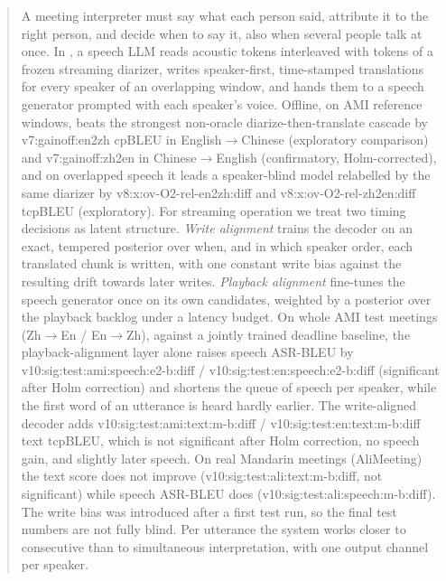 \begin{abstract}
A meeting interpreter must say what each person said, attribute it to the right person, and decide when to say it, also
when several people talk at once. In \sys{}, a speech LLM reads acoustic tokens interleaved with tokens of a frozen
streaming diarizer, writes speaker-first, time-stamped translations for every speaker of an overlapping window, and hands
them to a speech generator prompted with each speaker's voice. Offline, on AMI reference windows, \sys{} beats the
strongest non-oracle diarize-then-translate cascade by \num{v7:gainoff:en2zh} cpBLEU in English$\rightarrow$Chinese
(exploratory comparison) and \num{v7:gainoff:zh2en} in Chinese$\rightarrow$English (confirmatory, Holm-corrected), and on
overlapped speech it leads a speaker-blind model relabelled by the same diarizer by \num{v8:x:ov-O2-rel-en2zh:diff} and
\num{v8:x:ov-O2-rel-zh2en:diff} tcpBLEU (exploratory). For streaming operation we treat two timing decisions as latent
structure. \emph{Write alignment} trains the decoder on an exact, tempered posterior over when, and in which speaker order,
each translated chunk is written, with one constant write bias against the resulting drift towards later writes.
\emph{Playback alignment} fine-tunes the speech generator once on its own candidates, weighted by a posterior over the
playback backlog under a latency budget. On whole AMI test meetings (Zh$\rightarrow$En / En$\rightarrow$Zh), against a
jointly trained deadline baseline, the playback-alignment layer alone raises speech ASR-BLEU by
\num{v10:sig:test:ami:speech:e2-b:diff} / \num{v10:sig:test:en:speech:e2-b:diff} (significant after Holm correction) and
shortens the queue of speech per speaker, while the first word of an utterance is heard hardly earlier. The write-aligned
decoder adds \num{v10:sig:test:ami:text:m-b:diff} / \num{v10:sig:test:en:text:m-b:diff} text tcpBLEU, which is not
significant after Holm correction, no speech gain, and slightly later speech. On real Mandarin meetings (AliMeeting) the
text score does not improve (\num{v10:sig:test:ali:text:m-b:diff}, not significant) while speech ASR-BLEU does
(\num{v10:sig:test:ali:speech:m-b:diff}). The write bias was introduced after a first test run, so
the final test numbers are not fully blind. Per utterance the system works closer to consecutive than to simultaneous
interpretation, with one output channel per speaker.
\end{abstract}
